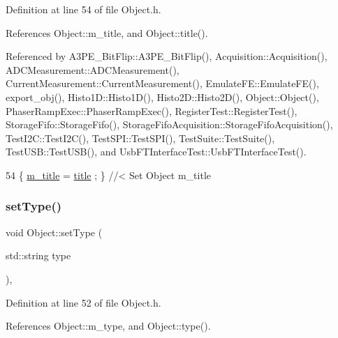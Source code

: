 Definition at line 54 of file Object.\+h.



References Object\+::m\+\_\+title, and Object\+::title().



Referenced by A3\+P\+E\+\_\+\+Bit\+Flip\+::\+A3\+P\+E\+\_\+\+Bit\+Flip(), Acquisition\+::\+Acquisition(), A\+D\+C\+Measurement\+::\+A\+D\+C\+Measurement(), Current\+Measurement\+::\+Current\+Measurement(), Emulate\+F\+E\+::\+Emulate\+F\+E(), export\+\_\+obj(), Histo1\+D\+::\+Histo1\+D(), Histo2\+D\+::\+Histo2\+D(), Object\+::\+Object(), Phaser\+Ramp\+Exec\+::\+Phaser\+Ramp\+Exec(), Register\+Test\+::\+Register\+Test(), Storage\+Fifo\+::\+Storage\+Fifo(), Storage\+Fifo\+Acquisition\+::\+Storage\+Fifo\+Acquisition(), Test\+I2\+C\+::\+Test\+I2\+C(), Test\+S\+P\+I\+::\+Test\+S\+P\+I(), Test\+Suite\+::\+Test\+Suite(), Test\+U\+S\+B\+::\+Test\+U\+S\+B(), and Usb\+F\+T\+Interface\+Test\+::\+Usb\+F\+T\+Interface\+Test().


\begin{DoxyCode}
54 \{ \hyperlink{classObject_affbeea1953eb5163573b92fad8f75727}{m\_title} = \hyperlink{classObject_a73a0f1a41828fdd8303dd662446fb6c3}{title} ; \} \textcolor{comment}{//< Set Object m\_title}
\end{DoxyCode}
\mbox{\label{classObject_aae534cc9d982bcb9b99fd505f2e103a5}} 
\subsubsection{\texorpdfstring{set\+Type()}{setType()}}
{\footnotesize\ttfamily void Object\+::set\+Type (\begin{DoxyParamCaption}\item[{std\+::string}]{type }\end{DoxyParamCaption})\hspace{0.3cm}{\ttfamily [inline]}, {\ttfamily [inherited]}}



Definition at line 52 of file Object.\+h.



References Object\+::m\+\_\+type, and Object\+::type().



